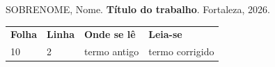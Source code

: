 \noindent SOBRENOME, Nome. \textbf{Título do trabalho}. Fortaleza, 2026.

\begin{center}
\begin{tabular}{llll}
\textbf{Folha} & \textbf{Linha} & \textbf{Onde se lê} & \textbf{Leia-se}\\
10 & 2 & termo antigo & termo corrigido
\end{tabular}
\end{center}
